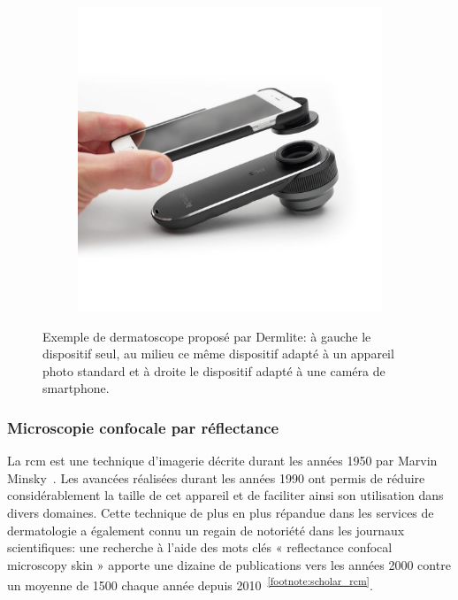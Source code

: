 \begin{figure}[H]
\begin{subfigure}{.32\textwidth}
    \end{subfigure}
    \begin{subfigure}{.32\textwidth}
      \centering
      \includegraphics[width=\linewidth]{contents/chapter_2/resources/example_device_dermlite_3.png}
    \end{subfigure}
    \caption{Exemple de dermatoscope proposé par Dermlite: à gauche le dispositif seul, au milieu ce même dispositif adapté à un appareil photo standard et à droite le dispositif adapté à une caméra de smartphone.}
    \label{fig:example_device_dermlite}
\end{figure}\par

\subsubsection{Microscopie confocale par réflectance}
La \gls{rcm} est une technique d’imagerie décrite durant les années 1950 par Marvin Minsky~\cite{Sheppard2019}. Les avancées réalisées durant les années 1990 ont permis de réduire considérablement la taille de cet appareil et de faciliter ainsi son utilisation dans divers domaines. Cette technique de plus en plus répandue dans les services de dermatologie a également connu un regain de notoriété dans les journaux scientifiques: une recherche à l’aide des mots clés « reflectance confocal microscopy skin » apporte une dizaine de publications vers les années 2000 contre un moyenne de 1500 chaque année depuis 2010~\textsuperscript{\ref{footnote:scholar_rcm}}.\par


